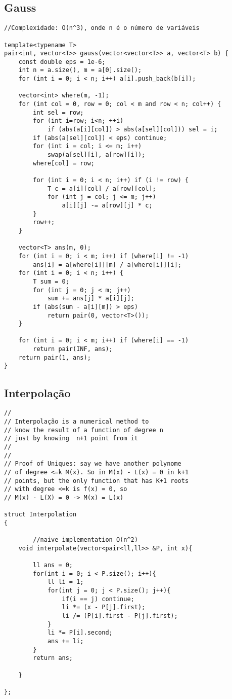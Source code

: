 \documentclass[11pt, a4paper, twoside]{article}
\begin{document}
\subsection{Gauss}
\begin{verbatim}
//Complexidade: O(n^3), onde n é o número de variáveis

template<typename T>
pair<int, vector<T>> gauss(vector<vector<T>> a, vector<T> b) {
	const double eps = 1e-6;
	int n = a.size(), m = a[0].size();
	for (int i = 0; i < n; i++) a[i].push_back(b[i]);
    
	vector<int> where(m, -1);
	for (int col = 0, row = 0; col < m and row < n; col++) {
		int sel = row;
		for (int i=row; i<n; ++i)
			if (abs(a[i][col]) > abs(a[sel][col])) sel = i;
		if (abs(a[sel][col]) < eps) continue;
		for (int i = col; i <= m; i++)
			swap(a[sel][i], a[row][i]);
		where[col] = row;
    
		for (int i = 0; i < n; i++) if (i != row) {
			T c = a[i][col] / a[row][col];
			for (int j = col; j <= m; j++)
				a[i][j] -= a[row][j] * c;
		}
		row++;
	}
    
	vector<T> ans(m, 0);
	for (int i = 0; i < m; i++) if (where[i] != -1)
		ans[i] = a[where[i]][m] / a[where[i]][i];
	for (int i = 0; i < n; i++) {
		T sum = 0;
		for (int j = 0; j < m; j++)
			sum += ans[j] * a[i][j];
		if (abs(sum - a[i][m]) > eps)
			return pair(0, vector<T>());
	}
    
	for (int i = 0; i < m; i++) if (where[i] == -1)
		return pair(INF, ans);
	return pair(1, ans);
}
\end{verbatim}

\subsection{Interpolação}
\begin{verbatim}
// 
// Interpolação is a numerical method to 
// know the result of a function of degree n 
// just by knowing  n+1 point from it
//
//
// Proof of Uniques: say we have another polynome
// of degree <=k M(x). So in M(x) - L(x) = 0 in k+1
// points, but the only function that has K+1 roots
// with degree <=k is f(x) = 0, so
// M(x) - L(X) = 0 -> M(x) = L(x)

struct Interpolation
{
        
        //naive implementation O(n^2)
    void interpolate(vector<pair<ll,ll>> &P, int x){
    
        ll ans = 0;
        for(int i = 0; i < P.size(); i++){
            ll li = 1;
            for(int j = 0; j < P.size(); j++){
                if(i == j) continue;
                li *= (x - P[j].first);
                li /= (P[i].first - P[j].first);
            }
            li *= P[i].second;
            ans += li;
        }
        return ans;
    
    }
    
};
\end{verbatim}
\end{document}

